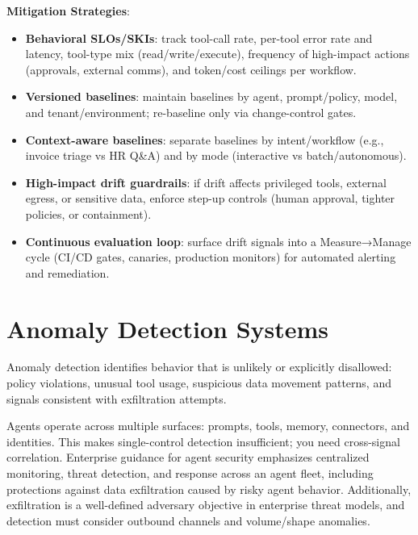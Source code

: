 \begin{TNtwocol}
    \textbf{Mitigation Strategies}:
    \begin{itemize}
        \item \textbf{Behavioral SLOs/SKIs}: track tool-call rate, per-tool error rate and latency, tool-type mix (read/write/execute), frequency of high-impact actions (approvals, external comms), and token/cost ceilings per workflow.
        \item \textbf{Versioned baselines}: maintain baselines by agent, prompt/policy, model, and tenant/environment; re-baseline only via change-control gates.
        \item \textbf{Context-aware baselines}: separate baselines by intent/workflow (e.g., invoice triage vs HR Q&A) and by mode (interactive vs batch/autonomous).
        \item \textbf{High-impact drift guardrails}: if drift affects privileged tools, external egress, or sensitive data, enforce step-up controls (human approval, tighter policies, or containment).
        \item \textbf{Continuous evaluation loop}: surface drift signals into a Measure→Manage cycle (CI/CD gates, canaries, production monitors) for automated alerting and remediation.
    \end{itemize}

    \section{Anomaly Detection Systems}

    Anomaly detection identifies behavior that is unlikely or explicitly disallowed: policy violations, unusual tool usage, suspicious data movement patterns, and signals consistent with exfiltration attempts.

    Agents operate across multiple surfaces: prompts, tools, memory, connectors, and identities. This makes single-control detection insufficient; you need cross-signal correlation. Enterprise guidance for agent security emphasizes centralized monitoring, threat detection, and response across an agent fleet, including protections against data exfiltration caused by risky agent behavior.  Additionally, exfiltration is a well-defined adversary objective in enterprise threat models, and detection must consider outbound channels and volume/shape anomalies.


\end{TNtwocol}
